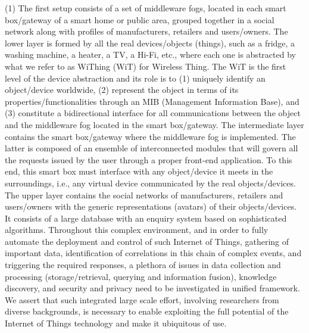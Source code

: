 (1)  The first setup consists of a set of middleware fogs, located in each smart box/gateway of a smart home or public area, grouped together in a social network along with profiles of manufacturers, retailers and users/owners. The lower layer is formed by all the real devices/objects (things), such as a fridge, a washing machine, a heater, a TV, a Hi-Fi, etc., where each one is abstracted by what we refer to as WiThing (WiT) for Wireless Thing. The WiT is the first level of the device abstraction and its role is to (1) uniquely identify an object/device worldwide, (2) represent the object in terms of its properties/functionalities through an MIB (Management Information Base), and (3) constitute a bidirectional interface for all communications between the object and the middleware fog located in the smart box/gateway. The intermediate layer contains the smart box/gateway where the middleware fog is implemented. The latter is composed of an ensemble of interconnected modules that will govern all the requests issued by the user through a proper front-end application. To this end, this smart box must interface with any object/device it meets in the surroundings, i.e., any virtual device communicated by the real objects/devices. The upper layer contains the social networks of manufacturers, retailers and users/owners with the generic representations (avatars) of their objects/devices. It consists of a large database with an enquiry system based on sophisticated algorithms.
Throughout this complex environment, and in order to fully automate the deployment and control of such Internet of Things, gathering of important data, identification of correlations in this chain of complex events, and triggering the required responses, a plethora of issues in data collection and processing (storage/retrieval, querying and information fusion), knowledge discovery, and security and privacy need to be investigated in unified framework. We assert that  such integrated large scale effort, involving researchers from diverse backgrounds, is necessary to  enable exploiting the full potential of the Internet of Things technology  and make it ubiquitous of use.\\

